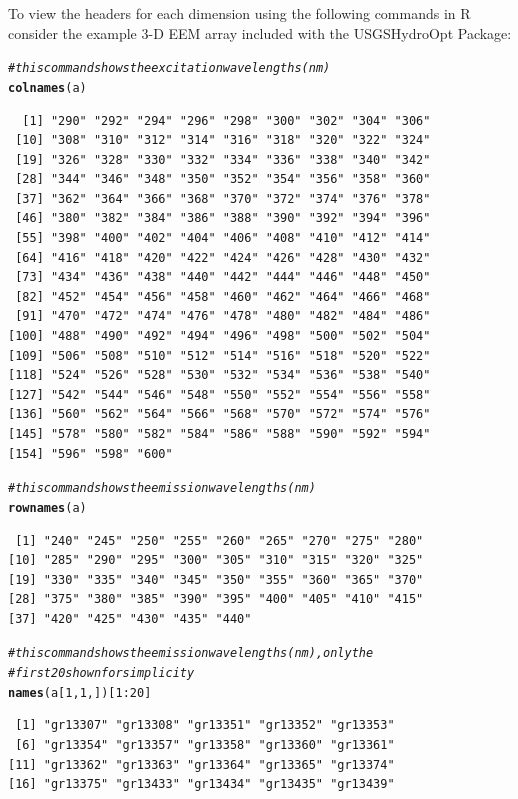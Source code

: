 \documentclass[a4paper,11pt]{article}\usepackage[]{graphicx}\usepackage[]{color}
\makeatletter
\newcommand{\hlnum}[1]{\textcolor[rgb]{0.686,0.059,0.569}{#1}}%
\newcommand{\hlcom}[1]{\textcolor[rgb]{0.678,0.584,0.686}{\textit{#1}}}%
\newcommand{\hlopt}[1]{\textcolor[rgb]{0,0,0}{#1}}%
\newcommand{\hlstd}[1]{\textcolor[rgb]{0.345,0.345,0.345}{#1}}%
\newcommand{\hlkwd}[1]{\textcolor[rgb]{0.737,0.353,0.396}{\textbf{#1}}}%
\newenvironment{kframe}{%
 \def\at@end@of@kframe{}%
 \ifinner\ifhmode%
  \def\at@end@of@kframe{\end{minipage}}%
  \begin{minipage}{\columnwidth}%
 \fi\fi%
 \def\FrameCommand##1{\hskip\@totalleftmargin \hskip-\fboxsep
 \colorbox{shadecolor}{##1}\hskip-\fboxsep
     \hskip-\linewidth \hskip-\@totalleftmargin \hskip\columnwidth}%
 \MakeFramed {\advance\hsize-\width
   \@totalleftmargin\z@ \linewidth\hsize
   \@setminipage}}%
 {\par\unskip\endMakeFramed%
 \at@end@of@kframe}
\newenvironment{knitrout}{}{} %
\makeatother
\begin{document}
To view the headers for each dimension using the following commands in R consider the example 3-D EEM array included with the USGSHydroOpt Package: 

\begin{knitrout}
\color{fgcolor}\begin{kframe}
\begin{alltt}
\hlcom{# this command shows the excitation wavelengths (nm)}
\hlkwd{colnames}\hlstd{(a)}
\end{alltt}
\begin{verbatim}
  [1] "290" "292" "294" "296" "298" "300" "302" "304" "306"
 [10] "308" "310" "312" "314" "316" "318" "320" "322" "324"
 [19] "326" "328" "330" "332" "334" "336" "338" "340" "342"
 [28] "344" "346" "348" "350" "352" "354" "356" "358" "360"
 [37] "362" "364" "366" "368" "370" "372" "374" "376" "378"
 [46] "380" "382" "384" "386" "388" "390" "392" "394" "396"
 [55] "398" "400" "402" "404" "406" "408" "410" "412" "414"
 [64] "416" "418" "420" "422" "424" "426" "428" "430" "432"
 [73] "434" "436" "438" "440" "442" "444" "446" "448" "450"
 [82] "452" "454" "456" "458" "460" "462" "464" "466" "468"
 [91] "470" "472" "474" "476" "478" "480" "482" "484" "486"
[100] "488" "490" "492" "494" "496" "498" "500" "502" "504"
[109] "506" "508" "510" "512" "514" "516" "518" "520" "522"
[118] "524" "526" "528" "530" "532" "534" "536" "538" "540"
[127] "542" "544" "546" "548" "550" "552" "554" "556" "558"
[136] "560" "562" "564" "566" "568" "570" "572" "574" "576"
[145] "578" "580" "582" "584" "586" "588" "590" "592" "594"
[154] "596" "598" "600"
\end{verbatim}
\begin{alltt}
\hlcom{# this command shows the emission wavelengths (nm)}
\hlkwd{rownames}\hlstd{(a)}
\end{alltt}
\begin{verbatim}
 [1] "240" "245" "250" "255" "260" "265" "270" "275" "280"
[10] "285" "290" "295" "300" "305" "310" "315" "320" "325"
[19] "330" "335" "340" "345" "350" "355" "360" "365" "370"
[28] "375" "380" "385" "390" "395" "400" "405" "410" "415"
[37] "420" "425" "430" "435" "440"
\end{verbatim}
\begin{alltt}
\hlcom{# this command shows the emission wavelengths (nm), only the}
\hlcom{# first 20 shown for simplicity}
\hlkwd{names}\hlstd{(a[}\hlnum{1}\hlstd{,} \hlnum{1}\hlstd{, ])[}\hlnum{1}\hlopt{:}\hlnum{20}\hlstd{]}
\end{alltt}
\begin{verbatim}
 [1] "gr13307" "gr13308" "gr13351" "gr13352" "gr13353"
 [6] "gr13354" "gr13357" "gr13358" "gr13360" "gr13361"
[11] "gr13362" "gr13363" "gr13364" "gr13365" "gr13374"
[16] "gr13375" "gr13433" "gr13434" "gr13435" "gr13439"
\end{verbatim}
\end{kframe}
\end{knitrout}
\end{document}
